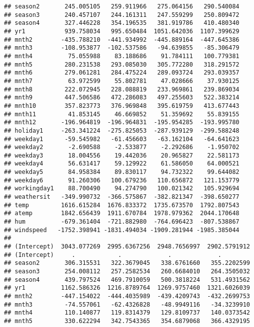 \documentclass[]{article}
\begin{document}
\begin{verbatim}
## season2       245.005105   259.911966   275.064156   290.540084
## season3       240.457107   244.161311   247.559299   250.809472
## season4       327.446228   354.196535   381.919786   410.480340
## yr1           939.758034   995.650484  1051.642036  1107.399629
## mnth2        -435.788210  -441.934992  -445.889164  -447.645386
## mnth3        -108.953877  -102.537586   -94.639855   -85.306479
## mnth4          75.055988    83.188686    91.784111   100.779381
## mnth5         280.231538   293.085030   305.772280   318.291572
## mnth6         279.061281   284.475224   289.093724   293.039357
## mnth7          63.972599    55.802781    47.028666    37.930125
## mnth8         222.072945   228.088819   233.969861   239.869034
## mnth9         447.506586   472.286083   497.255603   522.383214
## mnth10        357.823773   376.969848   395.619759   413.677443
## mnth11         41.853145    46.669852    51.359692    55.839155
## mnth12       -196.964819  -196.964831  -195.954285  -193.995780
## holiday1     -263.341224  -275.825053  -287.939129  -299.588248
## weekday1      -59.545982   -61.456603   -63.162104   -64.641623
## weekday2       -2.690588    -2.533877    -2.292686    -1.950702
## weekday3       18.004556    19.442036    20.965827    22.581173
## weekday4       56.631417    59.129922    61.586050    64.000521
## weekday5       84.958384    89.830117    94.732322    99.644082
## weekday6       91.260306   100.679236   110.656872   121.153779
## workingday1    88.700490    94.274790   100.021342   105.929694
## weathersit   -349.990732  -366.575867  -382.821347  -398.650277
## temp         1616.615284  1676.833372  1735.673570  1792.807543
## atemp        1842.656439  1911.670784  1978.979362  2044.170648
## hum          -679.361404  -721.882980  -764.696423  -807.538867
## windspeed   -1752.398941 -1831.494034 -1909.281944 -1985.385044
##                                                                   
## (Intercept)  3043.077269  2995.6367256  2948.7656997  2902.5791912
## (Intercept)     .            .             .             .        
## season2       306.315531   322.3679045   338.6761660   355.2202599
## season3       254.008112   257.2582534   260.6684010   264.3505032
## season4       439.797524   469.7910059   500.3818224   531.4931562
## yr1          1162.586326  1216.8789764  1269.9757460  1321.6026039
## mnth2        -447.154022  -444.4035989  -439.4209743  -432.2699753
## mnth3         -74.557061   -62.4326828   -48.9949116   -34.3239910
## mnth4         110.140877   119.8314379   129.8109737   140.0373542
## mnth5         330.622294   342.7543365   354.6879068   366.4329195

\end{verbatim}
\end{document}
